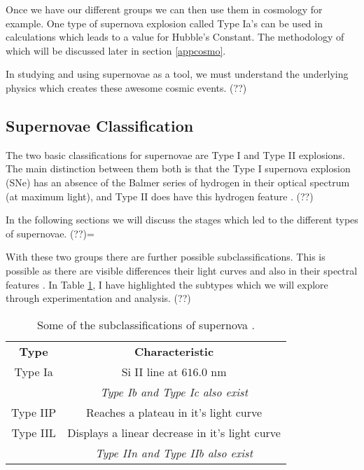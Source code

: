 \documentclass[twocolumn]{revtex4}
\begin{document}
Once we have our different groups we can then use them in cosmology for example. One type of supernova explosion called Type Ia's can be used in calculations which leads to a value for Hubble's Constant. The methodology of which will be discussed later in section \ref{appcosmo}.

In studying and using supernovae as a tool, we must understand the underlying physics which creates these awesome cosmic events. (??)

\vspace{-3ex}
\subsection{Supernovae Classification}
\vspace{-2ex}
The two basic classifications for supernovae are Type I and Type II explosions. The main distinction between them both is that the Type I supernova explosion (SNe) has an absence of the Balmer series of hydrogen in their optical spectrum (at maximum light), and Type II does have this hydrogen feature \cite{mod_ast, longair}. (??) 

In the following sections we will discuss the stages which led to the different types of supernovae. (??)=

With these two groups there are further possible subclassifications. This is possible as there are visible differences their light curves and also in their spectral features \cite{longair}. In Table \ref{sn_classes}, I have highlighted the subtypes which we will explore through experimentation and analysis. (??)

\begin{table}[h!]
\centering
\begin{tabular}{c@{\hskip 20pt}c} 
 \hline
 \textbf{Type} & \textbf{Characteristic} \\ 
 Type Ia		& Si II line at $616.0$ nm \\
 			& \em Type Ib and Type Ic also exist \em \\
 Type IIP 		& Reaches a plateau in it's light curve \\
 Type IIL		& Displays a linear decrease in it's light curve \\
 			& \em Type IIn and Type IIb also exist \em \\
 \hline
\end{tabular}
\caption{Some of the subclassifications of supernova \cite{longair}.}
\label{sn_classes}
\end{table}
\end{document}
